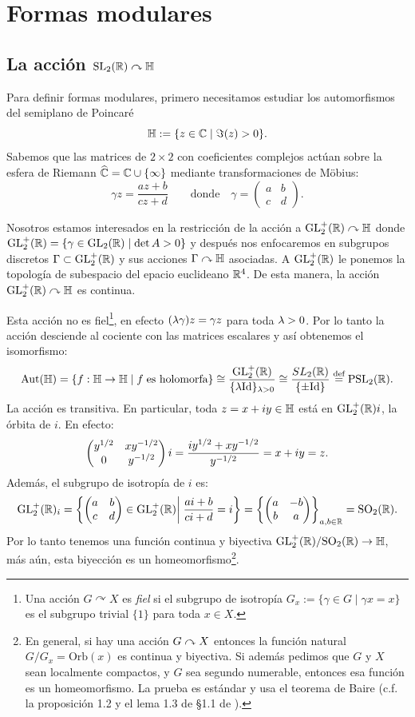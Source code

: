 \section{Formas modulares}\label{sec:formas_modulares}

\subsection{La acci\'on $\mathrm{SL}_2(\mathbb{R})\curvearrowright\mathbb{H}$}%

Para definir formas modulares, primero necesitamos estudiar los automorfismos del semiplano de
Poincar\'e $$\mathbb{H}:=\{z\in\mathbb{C}\mid \Im(z)>0\}.$$ Sabemos que las matrices de $2\times2$ con coeficientes
complejos act\'uan sobre la esfera de Riemann $\what{\CC}=\CC\cup\{\infty\}$ mediante transformaciones
de M\"obius:
\[
  \gamma z=\frac{az+b}{cz+d} \qquad\text{donde}\quad \gamma=\begin{pmatrix}a&b\\c&d\end{pmatrix}.
\]

Nosotros estamos interesados en la restricci\'on de la acci\'on a $\mathrm{GL}_2^+(\mathbb{R})\curvearrowright\mathbb{H}$ donde
$\mathrm{GL}_2^+(\mathbb{R})=\{\gamma\in\mathrm{GL}_2(\mathbb{R})\mid\det A>0\}$ y despu\'es nos enfocaremos en subgrupos
discretos $\Gamma\subset\mathrm{GL}_2^+(\mathbb{R})$ y sus acciones $\Gamma\curvearrowright\mathbb{H}$ asociadas.
A $\mathrm{GL}_2^+(\mathbb{R})$ le ponemos la topolog\'ia de subespacio del epacio euclideano $\mathbb{R}^4$. De esta
manera, la acci\'on $\mathrm{GL}_2^+(\mathbb{R})\curvearrowright\mathbb{H}$ es continua.

Esta acci\'on no es fiel\footnote[2]{Una acci\'on $G\curvearrowright X$ es \emph{fiel} si el subgrupo
  de isotrop\'ia $G_x:=\{\gamma\in G\mid \gamma x=x\}$ es el subgrupo trivial $\{1\}$ para toda
  $x\in X$.}, en efecto $(\lambda\gamma) z=\gamma z$ para toda $\lambda>0$. Por lo tanto la acci\'on
desciende al cociente con las matrices escalares y as\'i obtenemos el isomorfismo:
\[
  \mathrm{Aut}(\mathbb{H})=\{f:\mathbb{H}\rightarrow\mathbb{H}\mid f\;\text{es holomorfa}\}\cong
  \frac{\mathrm{GL}_2^+(\mathbb{R})}{\{\lambda\mathrm{Id}\}_{\lambda>0}}\cong\frac{SL_2(\mathbb{R})}{\{\pm\mathrm{Id}\}}
  \overset{\text{def}}{=}\mathrm{PSL}_2(\mathbb{R}).
\]
La acci\'on es transitiva. En particular, toda $z=x+iy\in\mathbb{H}$ est\'a en $\mathrm{GL}_2^+(\mathbb{R})i$, la
\'orbita de $i$. En efecto:
\[
  \begin{pmatrix}y^{1/2} & xy^{-1/2}\\ 0 & y^{-1/2}\end{pmatrix}i=\frac{iy^{1/2}+xy^{-1/2}}{y^{-1/2}}=x+iy=z.
\]
Adem\'as, el subgrupo de isotrop\'ia de $i$ es:
\[
  \mathrm{GL}_2^+(\mathbb{R})_i
  =\left\{\begin{pmatrix}a & b\\ c & d\end{pmatrix}\in\mathrm{GL}_2^+(\mathbb{R})\right|\left. \frac{ai+b}{ci+d}=i \right\}
  =\left\{\begin{pmatrix}a & -b\\ b & a\end{pmatrix}\right\}_{a,b\in\mathbb{R}}=\mathrm{SO}_2(\mathbb{R}).
\]
Por lo tanto tenemos una funci\'on continua y biyectiva $\mathrm{GL}_2^+(\mathbb{R})/\mathrm{SO}_2(\mathbb{R})\rightarrow\mathbb{H}$, m\'as
a\'un, esta biyecci\'on es un homeomorfismo\footnote{En general, si hay una acci\'on $G\curvearrowright X$
  entonces la funci\'on natural $G/G_x=\mathrm{Orb}(x)$ es continua y biyectiva. Si adem\'as pedimos
  que $G$ y $X$ sean localmente compactos, y $G$ sea segundo numerable, entonces esa funci\'on es
  un homeomorfismo. La prueba es est\'andar y usa el teorema de Baire (c.f. la proposici\'on 1.2 y el
  lema 1.3 de \S1.1 de \cite{MilneMFAMF}).}.

